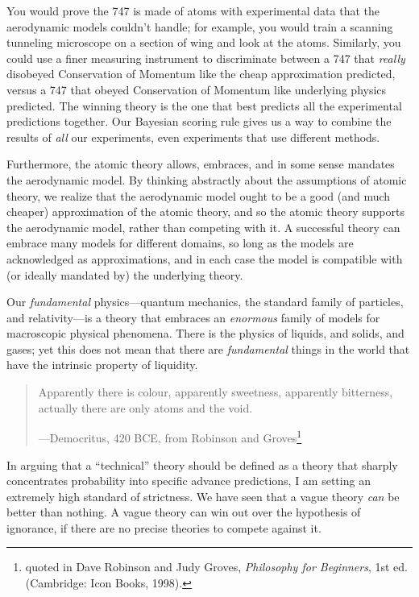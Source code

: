 {
 You would prove the 747 is made of atoms with experimental data
that the aerodynamic models couldn't handle; for
example, you would train a scanning tunneling microscope on a section
of wing and look at the atoms. Similarly, you could use a finer
measuring instrument to discriminate between a 747 that \textit{really}
disobeyed Conservation of Momentum like the cheap approximation
predicted, versus a 747 that obeyed Conservation of Momentum like
underlying physics predicted. The winning theory is the one that best
predicts all the experimental predictions together. Our Bayesian
scoring rule gives us a way to combine the results of \textit{all} our
experiments, even experiments that use different methods.}

{
 Furthermore, the atomic theory allows, embraces, and in some sense
mandates the aerodynamic model. By thinking abstractly about the
assumptions of atomic theory, we realize that the aerodynamic model
ought to be a good (and much cheaper) approximation of the atomic
theory, and so the atomic theory supports the aerodynamic model, rather
than competing with it. A successful theory can embrace many models for
different domains, so long as the models are acknowledged as
approximations, and in each case the model is compatible with (or
ideally mandated by) the underlying theory.}

{
 Our \textit{fundamental} physics---quantum mechanics, the standard
family of particles, and relativity---is a theory that embraces an
\textit{enormous} family of models for macroscopic physical phenomena.
There is the physics of liquids, and solids, and gases; yet this does
not mean that there are \textit{fundamental} things in the world that
have the intrinsic property of liquidity.}

\begin{quote}
{
 Apparently there is colour, apparently sweetness, apparently
bitterness, actually there are only atoms and the void.}

{\raggedleft
 {}---Democritus, 420 BCE, from Robinson and
Groves\footnote{quoted in Dave Robinson and Judy Groves, \textit{Philosophy
for Beginners}, 1st ed. (Cambridge: Icon Books, 1998).}
\par}
\end{quote}

\hr


{
 In arguing that a ``technical''
theory should be defined as a theory that sharply concentrates
probability into specific advance predictions, I am setting an
extremely high standard of strictness. We have seen that a vague theory
\textit{can} be better than nothing. A vague theory can win out over
the hypothesis of ignorance, if there are no precise theories to
compete against it.}


